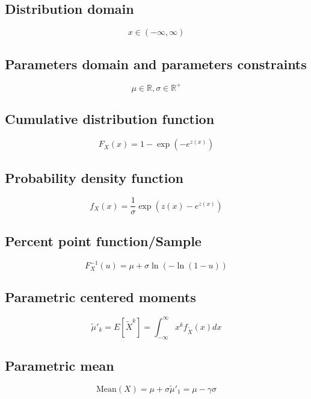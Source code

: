 \documentclass{article}
\begin{document}
\subsection{Distribution domain}
\begin{equation*} x\in\left(-\infty,\infty\right) \end{equation*}
\subsection{Parameters domain and parameters constraints}
\begin{equation*} \mu\in\mathbb{R}, \sigma\in\mathbb{R}^{+} \end{equation*}
\subsection{Cumulative distribution function}
\begin{equation*} F_{X}\left(x\right)=1-\exp\left(-e^{z(x)}\right) \end{equation*}
\subsection{Probability density function}
\begin{equation*} f_{X}\left(x\right)=\frac{1}{\sigma}\exp\left(z(x)-e^{z(x)}\right) \end{equation*}
\subsection{Percent point function/Sample}
\begin{equation*} F^{-1}_{X}\left(u\right)=\mu+\sigma\ln\left(-\ln\left(1-u\right)\right) \end{equation*}
\subsection{Parametric centered moments}
\begin{equation*} \tilde{\mu}'_{k}=E[\tilde{X}^k]=\int_{-\infty}^{\infty}x^{k}f_{\tilde{X}}\left(x\right)dx \end{equation*}
\subsection{Parametric mean}
\begin{equation*} \mathrm{Mean}(X)=\mu+\sigma\tilde{\mu}'_{1}=\mu-\gamma\sigma \end{equation*}
\end{document}
